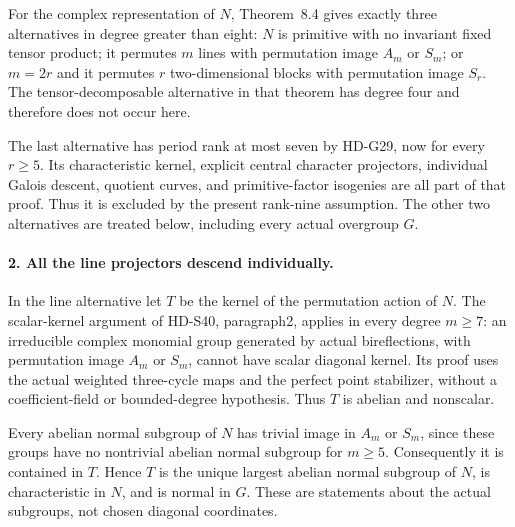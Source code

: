 For the complex representation of \(N\), Theorem~8.4 gives
exactly three alternatives in degree greater than eight:
\(N\) is primitive with no invariant fixed tensor product;
it permutes \(m\) lines with permutation image \(A_m\)
or \(S_m\); or \(m=2r\) and it permutes \(r\)
two-dimensional blocks with permutation image \(S_r\).
The tensor-decomposable alternative in that theorem has degree
four and therefore does not occur here.

The last alternative has period rank at most seven by HD-G29,
now for every \(r\ge5\). Its characteristic kernel,
explicit central character projectors, individual Galois
descent, quotient curves, and primitive-factor isogenies are
all part of that proof. Thus it is excluded by the present
rank-nine assumption. The other two alternatives are treated
below, including every actual overgroup \(G\).

\paragraph{2. All the line projectors descend individually.}
In the line alternative let \(T\) be the kernel of the
permutation action of \(N\). The scalar-kernel argument of
HD-S40, paragraph2, applies in every degree \(m\ge7\):
an irreducible complex monomial group generated by actual
bireflections, with permutation image \(A_m\) or \(S_m\),
cannot have scalar diagonal kernel. Its proof uses the actual
weighted three-cycle maps and the perfect point stabilizer,
without a coefficient-field or bounded-degree hypothesis.
Thus \(T\) is abelian and nonscalar.

Every abelian normal subgroup of \(N\) has trivial image
in \(A_m\) or \(S_m\), since these groups have no
nontrivial abelian normal subgroup for \(m\ge5\).
Consequently it is contained in \(T\). Hence \(T\)
is the unique largest abelian normal subgroup of \(N\),
is characteristic in \(N\), and is normal in \(G\).
These are statements about the actual subgroups, not chosen
diagonal coordinates.

